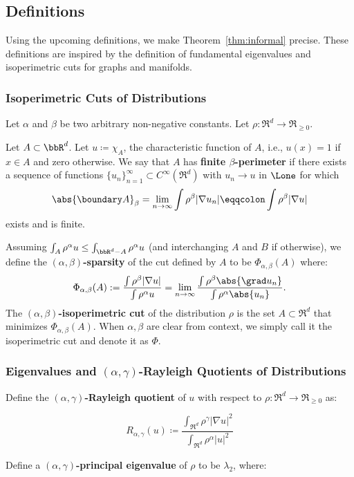 \subsection{Definitions}\label{sec:definitions}
Using the upcoming definitions, we make
Theorem~\ref{thm:informal} precise. These definitions are
inspired by the definition of fundamental eigenvalues and
isoperimetric cuts for graphs and manifolds.

\subsubsection{Isoperimetric Cuts of Distributions}
Let $\alpha$ and $\beta$ be two arbitrary non-negative constants.
Let $\rho: \Re^d \rightarrow \Re_{\geq 0}$.

Let $A \subset \bbR^d$. 
Let $u\coloneqq \chi_A$, the characteristic function of $A$, i.e., $u(x) =
1$ if $x \in A$ and zero otherwise.  We say that $A$ has
\textbf{finite $\beta$-perimeter} if there exists a sequence of
functions $\{u_n\}_{n=1}^\infty \subset C^\infty(\Re^d)$ with $u_n
\rightarrow u$ in $\Lone$ for which \cite{EvansMeasure15}
\[
\abs{\boundary A}_\beta
= \lim_{n \rightarrow \infty} \int  \rho^\beta|\nabla u_n|
\eqqcolon  \int  \rho^\beta|\nabla u|
\]
exists and is finite.

Assuming $\int_{A} \rho^\alpha u \leq \int_{\bbR^d - A}
\rho^\alpha u $ (and interchanging $A$ and $B$ if otherwise), we define the
\textbf{$(\alpha, \beta)$-sparsity} of the cut defined by $A$
to be $\Phi_{\alpha, \beta}(A)$ where:
\[
  \Phi_{\alpha, \beta} (A) 
:= \frac{\int \rho^\beta |\nabla u|}{\int \rho^\alpha u}
= \lim_{n\to\infty}\frac{\int \rho^\beta\abs{\grad u_n}}{\int \rho^\alpha \abs{u_n}}.
\]
The \textbf{$(\alpha, \beta)$-isoperimetric cut} of the
distribution $\rho$ is the set $A \subset \Re^d$ that minimizes $\Phi_{\alpha,
\beta}(A)$. When $\alpha, \beta$ are clear from context, we
simply call it the isoperimetric cut and denote it as $\Phi$.
\subsubsection{Eigenvalues and $(\alpha, \gamma)$-Rayleigh Quotients of Distributions}
Define the \textbf{$(\alpha, \gamma)$-Rayleigh quotient} of $u$ with
respect to $\rho:\Re^d \to \Re_{\geq 0}$ as:

\[
  R_{\alpha, \gamma}(u) \coloneqq \frac{\int_{\Re^d} \rho^\gamma
  |\nabla u|^2}{\int_{\Re^d} \rho^{\alpha}|u|^2} 
\]

Define a \textbf{$(\alpha, \gamma)$-principal eigenvalue} of $\rho$ to be
$\lambda_2$, where:

